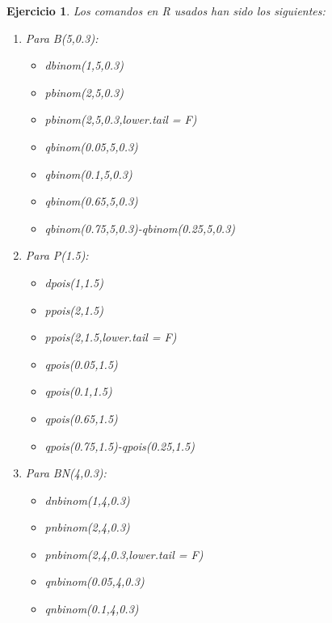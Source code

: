 \documentclass[11pt, a4paper]{article}
\newif\IfInSansMode
\theoremstyle{theorem-style}
\theoremstyle{definition-style}
\newtheorem{ejer}{Ejercicio}[section]
\theoremstyle{remark-style}
\theoremstyle{example-style}
\begin{document}
\begin{ejer}
Los comandos en R usados han sido los siguientes:

\begin{enumerate}
	\item Para B(5,0.3):
			\begin{itemize}
				\item dbinom(1,5,0.3)
				
				\item pbinom(2,5,0.3)
				
				\item pbinom(2,5,0.3,lower.tail = F)
				
				\item qbinom(0.05,5,0.3)
				
				\item qbinom(0.1,5,0.3)
				
				\item qbinom(0.65,5,0.3)
				
				\item qbinom(0.75,5,0.3)-qbinom(0.25,5,0.3)
			\end{itemize}
	\item Para P(1.5):
	\begin{itemize}
		\item dpois(1,1.5)
		
		\item ppois(2,1.5)
		
		\item ppois(2,1.5,lower.tail = F)
		
		\item qpois(0.05,1.5)
		
		\item qpois(0.1,1.5)
		
		\item qpois(0.65,1.5)
		
		\item qpois(0.75,1.5)-qpois(0.25,1.5)
	\end{itemize}
	\item Para BN(4,0.3):
	\begin{itemize}
		\item dnbinom(1,4,0.3)
		
		\item pnbinom(2,4,0.3)
		
		\item pnbinom(2,4,0.3,lower.tail = F)
		
		\item qnbinom(0.05,4,0.3)
		
		\item qnbinom(0.1,4,0.3)
		

\end{itemize}
\end{enumerate}
\end{ejer}
\end{document}
